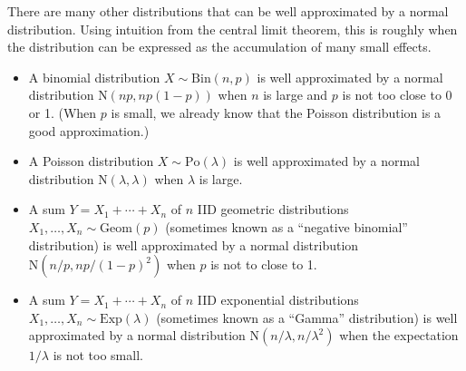 \documentclass[
  a4paper,
]{book}
\providecommand{\tightlist}{%
  \setlength{\itemsep}{0pt}\setlength{\parskip}{0pt}}
\theoremstyle{definition}
\theoremstyle{definition}
\theoremstyle{definition}
\theoremstyle{definition}
\theoremstyle{remark}
\begin{document}
There are many other distributions that can be well approximated by a normal distribution. Using intuition from the central limit theorem, this is roughly when the distribution can be expressed as the accumulation of many small effects.

\begin{itemize}
\tightlist
\item
  A binomial distribution \(X \sim \mathrm{Bin}(n, p)\) is well approximated by a normal distribution \(\mathrm{N}(np, np(1-p))\) when \(n\) is large and \(p\) is not too close to 0 or 1. (When \(p\) is small, we already know that the Poisson distribution is a good approximation.)
\item
  A Poisson distribution \(X \sim \mathrm{Po}(\lambda)\) is well approximated by a normal distribution \(\mathrm{N}(\lambda, \lambda)\) when \(\lambda\) is large.
\item
  A sum \(Y = X_1 + \cdots + X_n\) of \(n\) IID geometric distributions \(X_1, \dots, X_n \sim \mathrm{Geom}(p)\) (sometimes known as a ``negative binomial'' distribution) is well approximated by a normal distribution \(\mathrm{N}(n/p, np/(1-p)^2)\) when \(p\) is not to close to 1.
\item
  A sum \(Y = X_1 + \cdots + X_n\) of \(n\) IID exponential distributions \(X_1, \dots, X_n \sim \mathrm{Exp}(\lambda)\) (sometimes known as a ``Gamma'' distribution) is well approximated by a normal distribution \(\mathrm{N}(n/\lambda, n/\lambda^2)\) when the expectation \(1/\lambda\) is not too small.
\end{itemize}
\end{document}
